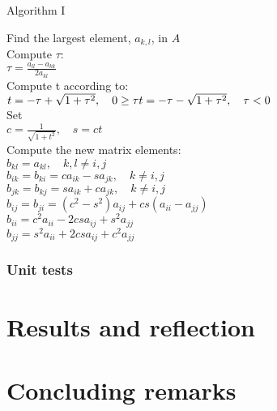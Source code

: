 \documentclass[11pt,a4paper,english,draft]{article}
\numberwithin{equation}{section}
\begin{document}
\centerline{Algorithm I}
\begin{tcolorbox}
Find the largest element, $a_{k,l}$, in $A$ \\
Compute $\tau:$ \\
$ \tau = \frac{a_{ll}-a_{kk}}{2a_{kl}}$ \\
Compute t according to:  \\
$t=  -\tau + \sqrt{1+\tau^2}, \quad   0  \geq \tau \\
t=  -\tau - \sqrt{1+\tau^2}, \quad   \tau <  0 $ \\
Set \\
$ c= \frac{1}{\sqrt{1+t^2}}, \quad s= ct$ \\
Compute the new matrix elements: \\
$ b_{kl} = a_{kl}, \quad k,l \neq i,j$ \\
$ b_{ik} = b_{ki} = ca_{ik}-sa_{jk}, \quad k \neq i,j$ \\
$ b_{jk} = b_{kj} = sa_{ik}+ca_{jk}, \quad k \neq i,j$ \\
$ b_{ij} = b_{ji} = (c^2 - s^2)a_{ij} + cs(a_{ii}-a_{jj}) $ \\
$ b_{ii} = c^2 a_{ii} - 2csa_{ij} + s^2 a_{jj} $ \\
$ b_{jj} = s^2 a_{ii} + 2csa_{ij} + c^2 a_{jj} $ \\

\end{tcolorbox} 

\subsubsection{Unit tests}


\section{Results and reflection}

\section{Concluding remarks }
\end{document}

